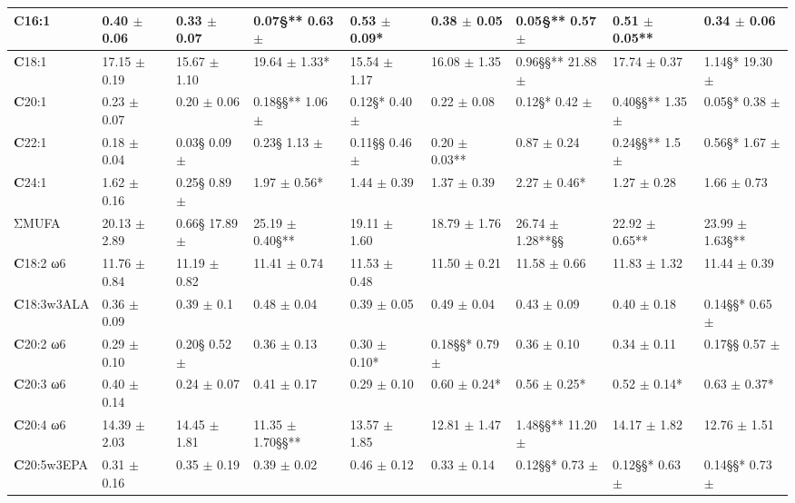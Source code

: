 \documentclass[11pt]{article}
\begin{document}
\begin{table}
{\begin{tabular}{|l|l|l|l|l|l|l|l|l|}
\hline
\textbf{C}16:1 & 0.40 $\pm$ 0.06 & 0.33 $\pm$ 0.07 & 0.07§** 0.63 $\pm$ & 0.53 $\pm$ 0.09* & 0.38 $\pm$ 0.05 & 0.05§** 0.57 $\pm$ & 0.51 $\pm$ 0.05** & 0.34 $\pm$ 0.06 \\
\hline
\textbf{C}18:1 & 17.15 $\pm$ 0.19 & 15.67 $\pm$ 1.10 & 19.64 $\pm$ 1.33* & 15.54 $\pm$ 1.17 & 16.08 $\pm$ 1.35 & 0.96§§** 21.88 $\pm$ & 17.74 $\pm$ 0.37 & 1.14§* 19.30 $\pm$ \\
\hline
\textbf{C}20:1 & 0.23 $\pm$ 0.07 & 0.20 $\pm$ 0.06 & 0.18§§** 1.06 $\pm$ & 0.12§* 0.40 $\pm$ & 0.22 $\pm$ 0.08 & 0.12§* 0.42 $\pm$ & 0.40§§** 1.35 $\pm$ & 0.05§* 0.38 $\pm$ \\
\hline
\textbf{C}22:1 & 0.18 $\pm$ 0.04 & 0.03§ 0.09 $\pm$ & 0.23§ 1.13 $\pm$ & 0.11§§ 0.46 $\pm$ & 0.20 $\pm$ 0.03** & 0.87 $\pm$ 0.24 & 0.24§§** 1.5 $\pm$ & 0.56§* 1.67 $\pm$ \\
\hline
\textbf{C}24:1 & 1.62 $\pm$ 0.16 & 0.25§ 0.89 $\pm$ & 1.97 $\pm$ 0.56* & 1.44 $\pm$ 0.39 & 1.37 $\pm$ 0.39 & 2.27 $\pm$ 0.46* & 1.27 $\pm$ 0.28 & 1.66 $\pm$ 0.73 \\
\hline
ΣMUFA & 20.13 $\pm$ 2.89 & 0.66§ 17.89 $\pm$ & 25.19 $\pm$ 0.40§** & 19.11 $\pm$ 1.60 & 18.79 $\pm$ 1.76 & 26.74 $\pm$ 1.28**§§ & 22.92 $\pm$ 0.65** & 23.99 $\pm$ 1.63§** \\
\hline
\textbf{C}18:2 ω6 & 11.76 $\pm$ 0.84 & 11.19 $\pm$ 0.82 & 11.41 $\pm$ 0.74 & 11.53 $\pm$ 0.48 & 11.50 $\pm$ 0.21 & 11.58 $\pm$ 0.66 & 11.83 $\pm$ 1.32 & 11.44 $\pm$ 0.39 \\
\hline
\textbf{C}18:3w3ALA & 0.36 $\pm$ 0.09 & 0.39 $\pm$ 0.1 & 0.48 $\pm$ 0.04 & 0.39 $\pm$ 0.05 & 0.49 $\pm$ 0.04 & 0.43 $\pm$ 0.09 & 0.40 $\pm$ 0.18 & 0.14§§* 0.65 $\pm$ \\
\hline
\textbf{C}20:2 ω6 & 0.29 $\pm$ 0.10 & 0.20§ 0.52 $\pm$ & 0.36 $\pm$ 0.13 & 0.30 $\pm$ 0.10* & 0.18§§* 0.79 $\pm$ & 0.36 $\pm$ 0.10 & 0.34 $\pm$ 0.11 & 0.17§§ 0.57 $\pm$ \\
\hline
\textbf{C}20:3 ω6 & 0.40 $\pm$ 0.14 & 0.24 $\pm$ 0.07 & 0.41 $\pm$ 0.17 & 0.29 $\pm$ 0.10 & 0.60 $\pm$ 0.24* & 0.56 $\pm$ 0.25* & 0.52 $\pm$ 0.14* & 0.63 $\pm$ 0.37* \\
\hline
\textbf{C}20:4 ω6 & 14.39 $\pm$ 2.03 & 14.45 $\pm$ 1.81 & 11.35 $\pm$ 1.70§§** & 13.57 $\pm$ 1.85 & 12.81 $\pm$ 1.47 & 1.48§§** 11.20 $\pm$ & 14.17 $\pm$ 1.82 & 12.76 $\pm$ 1.51 \\
\hline
\textbf{C}20:5w3EPA & 0.31 $\pm$ 0.16 & 0.35 $\pm$ 0.19 & 0.39 $\pm$ 0.02 & 0.46 $\pm$ 0.12 & 0.33 $\pm$ 0.14 & 0.12§§* 0.73 $\pm$ & 0.12§§* 0.63 $\pm$ & 0.14§§* 0.73 $\pm$ \\

\end{tabular}}
\end{table}
\end{document}
